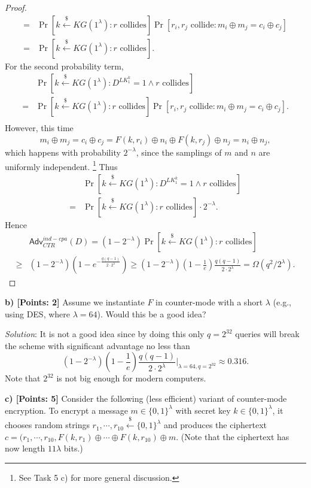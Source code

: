 \documentclass[12pt]{article}
\newcommand{\bits}{\{0,1\}}
\newcommand{\getsr}{\stackrel{\$}{\gets}}
\newcommand{\Adv}{\textsf{Adv}}
\theoremstyle{definition}
\begin{document}
\begin{proof}
$$\begin{aligned}
=& \Pr[k \getsr KG(1^\lambda): \textrm{$r$ collides}]\Pr[\textrm{$r_i, r_j$ collide} : m_i \oplus m_j = c_i \oplus c_j] \\
=& \Pr[k \getsr KG(1^\lambda): \textrm{$r$ collides}].
\end{aligned}$$
For the second probability term,
$$\begin{aligned}
& \Pr[k \getsr KG(1^\lambda) : D^{LK_1^k}=1 \wedge \textrm{$r$ collides}] \\
=& \Pr[k \getsr KG(1^\lambda): \textrm{$r$ collides}]\Pr[\textrm{$r_i, r_j$ collide} : m_i \oplus m_j = c_i \oplus c_j]. \\
\end{aligned}$$
However, this time 
$$m_i \oplus m_j = c_i \oplus c_j = F(k, r_i) \oplus n_i \oplus F(k, r_j) \oplus n_j = n_i \oplus n_j,$$
which happens with probability $2^{-\lambda}$, since the samplings of $m$ and $n$ are uniformly independent. \footnote{See Task 5 c) for more general discussion.}
Thus
$$\begin{aligned}
& \Pr[k \getsr KG(1^\lambda) : D^{LK_1^k}=1 \wedge \textrm{$r$ collides}] \\
=& \Pr[k \getsr KG(1^\lambda): \textrm{$r$ collides}]\cdot 2^{-\lambda}. 
\end{aligned}$$
Hence 
$$\begin{aligned}
&\Adv_{CTR}^{ind-cpa}(D) = (1-2^{-\lambda}) \Pr[k \getsr KG(1^\lambda): \textrm{$r$ collides}] \\
\geq & (1-2^{-\lambda})(1-e^{-\frac{q(q-1)}{2\cdot 2^\lambda}}) \geq (1-2^{-\lambda})(1-\frac{1}{e})\frac{q(q-1)}{2\cdot 2^\lambda}
= \Omega(q^2/2^\lambda).
\end{aligned}$$
\end{proof}

{\bf b) [Points: 2]} Assume we instantiate $F$ in counter-mode with a short $\lambda$ (e.g., using DES, where $\lambda = 64$). Would this be a good idea?

\emph{Solution}: It is not a good idea since by doing this only $q = 2^{32}$ queries will break the scheme with significant advantage no less than
$$(1-2^{-\lambda})(1-\frac{1}{e})\frac{q(q-1)}{2\cdot 2^\lambda} \bigg|_{\lambda = 64, q = 2^{32}} \approx 0.316.$$
Note that $2^{32}$ is not big enough for modern computers.

{\bf c) [Points: 5]} Consider the following (less efficient) variant of counter-mode encryption.
To encrypt a message $m \in \bits^\lambda$ with secret key $k \in \bits^\lambda$, it chooses random strings $r_1, \cdots, r_{10} \getsr \bits^\lambda$ and produces the ciphertext $c = (r_1, \cdots, r_{10}, F(k, r_1) \oplus \cdots \oplus F(k, r_{10}) \oplus m$. (Note that the ciphertext has now length $11\lambda$ bits.)
\end{document}
